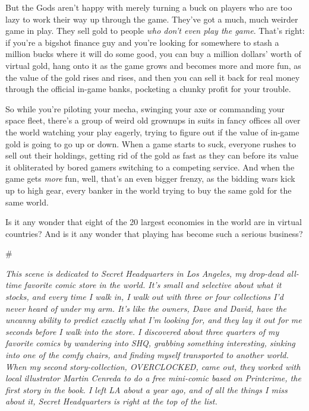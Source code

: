 But the Gods aren't happy with merely turning a buck on players who
are too lazy to work their way up through the game. They've got a
much, much weirder game in play. They sell gold to people
\emph{who don't even play the game}. That's right: if you're a
bigshot finance guy and you're looking for somewhere to stash a
million bucks where it will do some good, you can buy a million
dollars' worth of virtual gold, hang onto it as the game grows and
becomes more and more fun, as the value of the gold rises and
rises, and then you can sell it back for real money through the
official in-game banks, pocketing a chunky profit for your
trouble.

So while you're piloting your mecha, swinging your axe or
commanding your space fleet, there's a group of weird old grownups
in suits in fancy offices all over the world watching your play
eagerly, trying to figure out if the value of in-game gold is going
to go up or down. When a game starts to suck, everyone rushes to
sell out their holdings, getting rid of the gold as fast as they
can before its value it obliterated by bored gamers switching to a
competing service. And when the game gets \emph{more} fun, well,
that's an even bigger frenzy, as the bidding wars kick up to high
gear, every banker in the world trying to buy the same gold for the
same world.

Is it any wonder that eight of the 20 largest economies in the
world are in virtual countries? And is it any wonder that playing
has become such a serious business?

\#

\emph{This scene is dedicated to Secret Headquarters in Los Angeles, my drop-dead all-time favorite comic store in the world. It's small and selective about what it stocks, and every time I walk in, I walk out with three or four collections I'd never heard of under my arm. It's like the owners, Dave and David, have the uncanny ability to predict exactly what I'm looking for, and they lay it out for me seconds before I walk into the store. I discovered about three quarters of my favorite comics by wandering into SHQ, grabbing something interesting, sinking into one of the comfy chairs, and finding myself transported to another world. When my second story-collection, OVERCLOCKED, came out, they worked with local illustrator Martin Cenreda to do a free mini-comic based on Printcrime, the first story in the book. I left LA about a year ago, and of all the things I miss about it, Secret Headquarters is right at the top of the list.}


